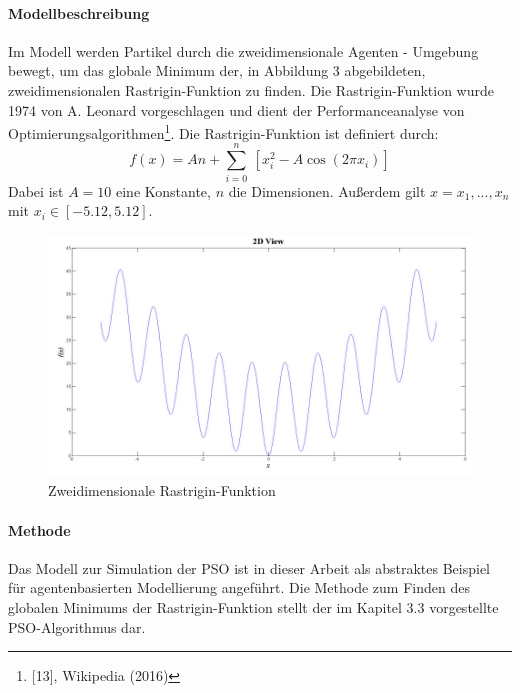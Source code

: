 \documentclass[a4paper, 11pt]{article}
\begin{document}
\paragraph{Modellbeschreibung}
Im Modell werden Partikel durch die zweidimensionale Agenten - Umgebung bewegt, um das globale Minimum der, in Abbildung 3 abgebildeten, zweidimensionalen Rastrigin-Funktion zu finden. Die Rastrigin-Funktion wurde 1974 von A. Leonard vorgeschlagen und dient der Performanceanalyse von Optimierungsalgorithmen\footnote{[13], Wikipedia (2016)}. Die Rastrigin-Funktion ist definiert durch:\newline
\begin{equation}
f(x) = An +  \sum_{i=0}^n \ [x_{i}^2 - A \cos (2\pi x_{i})]
\end{equation}
Dabei ist $A = 10$ eine Konstante, $n$ die Dimensionen. Außerdem gilt $x = {x_{1},...,x_{n}}$ mit $x_{i} \in [-5.12,5.12]$.\newline
\begin{figure}[h]
	\begin{center}
		\includegraphics[width=1\textwidth]{rastrigin}
	\end{center}
	\hspace{1in}\parbox{4in}{\caption[zweidimensionale Rastrigin-Funktion]{Zweidimensionale Rastrigin-Funktion\footnotemark}}
	\label{rastabb}
\end{figure}
\paragraph{Methode}
Das Modell zur Simulation der \acs{PSO} ist in dieser Arbeit als abstraktes Beispiel für agentenbasierten Modellierung angeführt. Die Methode zum Finden des globalen Minimums der Rastrigin-Funktion stellt der im Kapitel 3.3 vorgestellte \acs{PSO}-Algorithmus dar.
\end{document}
